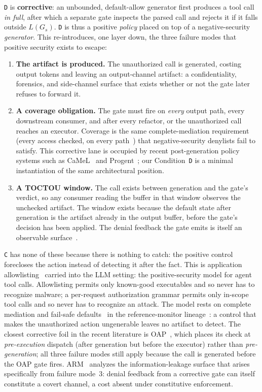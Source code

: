 \texttt{D} is \textbf{corrective}: an unbounded, default-allow generator first produces a tool call \emph{in full}, after which a separate gate inspects the parsed call and rejects it if it falls outside \(L(G_s)\). \texttt{D} is thus a positive \emph{policy} placed on top of a negative-security \emph{generator}. This re-introduces, one layer down, the three failure modes that positive security exists to escape:
\begin{enumerate}[leftmargin=2em,itemsep=2pt]
  \item \textbf{The artifact is produced.} The unauthorized call is generated, costing output tokens and leaving an output-channel artifact: a confidentiality, forensics, and side-channel surface that exists whether or not the gate later refuses to forward it.
  \item \textbf{A coverage obligation.} The gate must fire on \emph{every} output path, every downstream consumer, and after every refactor, or the unauthorized call reaches an executor. Coverage is the same complete-mediation requirement (every access checked, on every path~\cite{saltzer1975}) that negative-security denylists fail to satisfy. This corrective lane is occupied by recent post-generation policy systems such as CaMeL~\cite{camel2025} and Progent~\cite{progent2025}; our Condition~\texttt{D} is a minimal instantiation of the same architectural position.
  \item \textbf{A TOCTOU window.} The call exists between generation and the gate's verdict, so any consumer reading the buffer in that window observes the unchecked artifact. The window exists because the default state after generation is the artifact already in the output buffer, before the gate's decision has been applied. The denial feedback the gate emits is itself an observable surface~\cite{arm2026}.
\end{enumerate}
\texttt{C} has none of these because there is nothing to catch: the positive control forecloses the action instead of detecting it after the fact. This is application allowlisting~\cite{galloway2020} carried into the LLM setting: the positive-security model for agent tool calls. Allowlisting permits only known-good executables and so never has to recognize malware; a per-request authorization grammar permits only in-scope tool calls and so never has to recognize an attack. The model rests on complete mediation and fail-safe defaults~\cite{saltzer1975} in the reference-monitor lineage~\cite{anderson1972}: a control that makes the unauthorized action ungenerable leaves no artifact to detect. The closest corrective foil in the recent literature is OAP~\cite{oap2026}, which places its check at \emph{pre-execution} dispatch (after generation but before the executor) rather than \emph{pre-generation}; all three failure modes still apply because the call is generated before the OAP gate fires. ARM~\cite{arm2026} analyzes the information-leakage surface that arises specifically from failure mode~3: denial feedback from a corrective gate can itself constitute a covert channel, a cost absent under constitutive enforcement.

